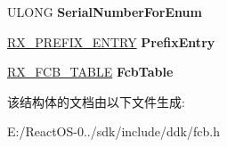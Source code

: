 \begin{DoxyCompactItemize}
U\+L\+O\+NG {\bfseries Serial\+Number\+For\+Enum}
\item 
\mbox{\label{struct___n_e_t___r_o_o_t_abd2f37b20b898b0ff4756f54ca6ca6e2}} 
\hyperlink{struct___r_x___p_r_e_f_i_x___e_n_t_r_y}{R\+X\+\_\+\+P\+R\+E\+F\+I\+X\+\_\+\+E\+N\+T\+RY} {\bfseries Prefix\+Entry}
\item 
\mbox{\label{struct___n_e_t___r_o_o_t_a47a467bfee0aa6810e005cb2d061776a}} 
\hyperlink{struct___r_x___f_c_b___t_a_b_l_e}{R\+X\+\_\+\+F\+C\+B\+\_\+\+T\+A\+B\+LE} {\bfseries Fcb\+Table}
\end{DoxyCompactItemize}


该结构体的文档由以下文件生成\+:\begin{DoxyCompactItemize}
\item 
E\+:/\+React\+O\+S-\/0../sdk/include/ddk/fcb.\+h\end{DoxyCompactItemize}
